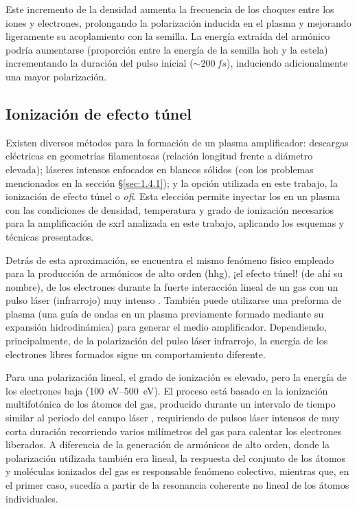 Este incremento de la densidad aumenta la frecuencia de los choques entre los iones y electrones, prolongando la polarización inducida en el plasma y mejorando ligeramente su acoplamiento con la semilla. La energía extraída del armónico podría aumentarse (proporción entre la energía de la semilla \acrshort{hoh} y la estela) incrementando la duración del pulso inicial ($\sim \qty{200}{fs}$), induciendo adicionalmente una mayor polarización. 

\subsection{Ionización de efecto túnel}\label{sec:1.4.2}
Existen diversos métodos para la formación de un plasma amplificador: descargas eléctricas en geometrías filamentosas \autocite{Kozlova2020a} (relación longitud frente a diámetro elevada); láseres intensos enfocados en blancos sólidos (con los problemas mencionados en la sección \S\ref{sec:1.4.1}); y la opción utilizada en este trabajo, la ionización de efecto túnel o \emph{\acrfull{ofi}}. Esta elección permite inyectar los  en un plasma con las condiciones de densidad, temperatura y grado de ionización necesarios para la amplificación de \acrshort{sxrl} analizada en este trabajo, aplicando los esquemas y técnicas presentados.

Detrás de esta aproximación, se encuentra el mismo fenómeno físico empleado para la producción de armónicos de alto orden (\acrshort{hhg}), ¡el efecto túnel! (de ahí su nombre), de los electrones durante la fuerte interacción lineal de un gas con un pulso láser (infrarrojo) muy intenso \autocite{Depresseux2015}. También puede utilizarse una preforma de plasma \autocite{Eder1992,Durfee1993} (una guía de ondas en un plasma previamente formado mediante su expansión hidrodinámica) para generar el medio amplificador. Dependiendo, principalmente, de la polarización del pulso láser infrarrojo, la energía de los electrones libres formados sigue un comportamiento diferente.

Para una polarización lineal, el grado de ionización es elevado, pero la energía de los electrones baja (\qtyrange{100}{500}{eV}). El proceso está basado en la ionización multifotónica de los átomos del gas, producido durante un intervalo de tiempo similar al periodo del campo láser \autocite{Burnett1990}, requiriendo de pulsos láser intensos de muy corta duración recorriendo varios milímetros del gas para calentar los electrones liberados. A diferencia de la generación de armónicos de alto orden, donde la polarización utilizada también era lineal, la respuesta del conjunto de los átomos y moléculas ionizados del gas es responsable fenómeno colectivo, mientras que, en el primer caso, sucedía a partir de la resonancia coherente no lineal de los átomos individuales.

